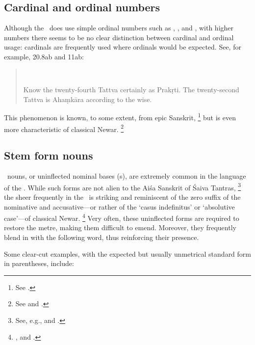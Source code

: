 
\subsection{Cardinal and ordinal numbers}

Although the \VSS\ does use simple ordinal numbers such 
as , , and , with higher 
numbers there seems to be no clear distinction between cardinal and ordinal usage:
cardinals are frequently used where ordinals would be expected.
See, for example, 20.8ab and 11ab:

\begin{quote}
\\

Know the twenty-fourth Tattva certainly as Prakṛti.
The twenty-second Tattva is Ahaṃkāra according to the wise.
\end{quote}

\noindent
This phenomenon is known, to some extent, from epic Sanskrit,%
	\footnote{See .}
but is even more characteristic of classical Newar.%
		\footnote{See  and .}



\subsection{Stem form nouns}\label{stemform}

\Stemform\ nouns, or uninflected nominal bases (s), are extremely common in the
language of the \VSS. While such forms are not alien to the Aiśa Sanskrit of Śaiva Tantras,%
		\footnote{See, e.g.,  and .}
the sheer frequently in the \VSS\ is striking and reminiscent of the zero suffix of the nominative and accusative---or
rather of the `casus indefinitus' or `absolutive case'---of classical Newar.%
		\footnote{, and .} 
Very often, these uninflected forms are required to restore the metre, making them difficult to emend.
Moreover, they frequently blend in  with the following word, thus reinforcing their presence.

Some clear-cut examples, with the expected but usually unmetrical standard form in parentheses, include:

